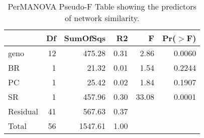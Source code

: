 \begin{table}[ht]
\centering
\begin{tabular}{lrrrrr}
  \hline
 & Df & SumOfSqs & R2 & F & Pr($>$F) \\ 
  \hline
geno & 12 & 475.28 & 0.31 & 2.86 & 0.0060 \\ 
  BR & 1 & 21.32 & 0.01 & 1.54 & 0.2244 \\ 
  PC & 1 & 25.42 & 0.02 & 1.84 & 0.1907 \\ 
  SR & 1 & 457.96 & 0.30 & 33.08 & 0.0001 \\ 
  Residual & 41 & 567.63 & 0.37 &  &  \\ 
  Total & 56 & 1547.61 & 1.00 &  &  \\ 
   \hline
\end{tabular}
\caption{PerMANOVA Pseudo-F Table showing the predictors of network similarity.} 
\label{tab:cn_perm}
\end{table}

